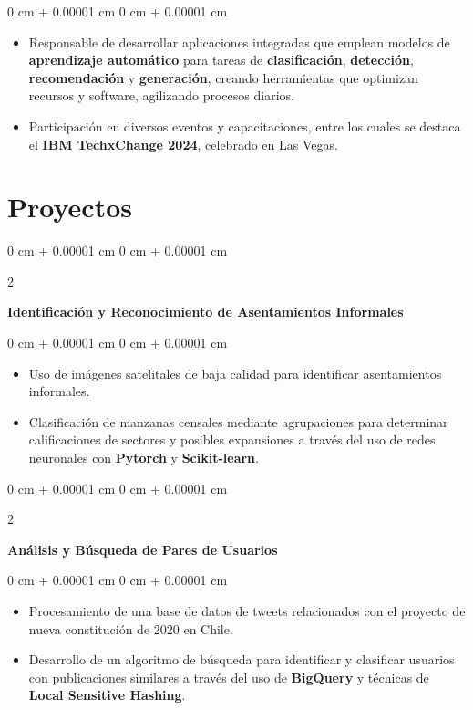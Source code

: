 \documentclass[10pt, letterpaper]{article}
\newenvironment{highlights}{
    \begin{itemize}[
        topsep=0.10 cm,
        parsep=0.10 cm,
        partopsep=0pt,
        itemsep=0pt,
        leftmargin=0 cm + 10pt
    ]
}{
    \end{itemize}
} %
\newenvironment{onecolentry}{
    \begin{adjustwidth}{
        0 cm + 0.00001 cm
    }{
        0 cm + 0.00001 cm
    }
}{
    \end{adjustwidth}
} %
\newenvironment{twocolentry}[2][]{
    \onecolentry
    \def\secondColumn{#2}
    \setcolumnwidth{\fill, 4.5 cm}
    \begin{paracol}{2}
}{
    \switchcolumn \raggedleft \secondColumn
    \end{paracol}
    \endonecolentry
} %
\begin{document}
\vspace{0.10 cm}
\begin{onecolentry}
    \begin{highlights}
    \item Responsable de desarrollar aplicaciones integradas que emplean modelos de \textbf{aprendizaje automático} para tareas de \textbf{clasificación}, \textbf{detección}, \textbf{recomendación} y \textbf{generación}, creando herramientas que optimizan recursos y software, agilizando procesos diarios.
    \item Participación en diversos eventos y capacitaciones, entre los cuales se destaca el \textbf{IBM TechxChange 2024}, celebrado en Las Vegas.
    \end{highlights}
\end{onecolentry}

\section{Proyectos}

\begin{twocolentry}{
}
    \textbf{Identificación y Reconocimiento de Asentamientos Informales}
\end{twocolentry}

\vspace{0.10 cm}
\begin{onecolentry}
    \begin{highlights}
    \item Uso de imágenes satelitales de baja calidad para identificar asentamientos informales.
    \item Clasificación de manzanas censales mediante agrupaciones para determinar calificaciones de sectores y posibles expansiones a través del uso de redes neuronales con \textbf{Pytorch} y \textbf{Scikit-learn}.
    \end{highlights}
\end{onecolentry}
\vspace{0.2 cm}
\begin{twocolentry}{
}

    \textbf{Análisis y Búsqueda de Pares de Usuarios}
\end{twocolentry}

\vspace{0.10 cm}
\begin{onecolentry}
    \begin{highlights}
    \item Procesamiento de una base de datos de tweets relacionados con el proyecto de nueva constitución de 2020 en Chile.
    \item Desarrollo de un algoritmo de búsqueda para identificar y clasificar usuarios con publicaciones similares a través del uso de \textbf{BigQuery} y técnicas de \textbf{Local Sensitive Hashing}.
    \end{highlights}
\end{onecolentry}
\vspace{0.2 cm}
\end{document}

